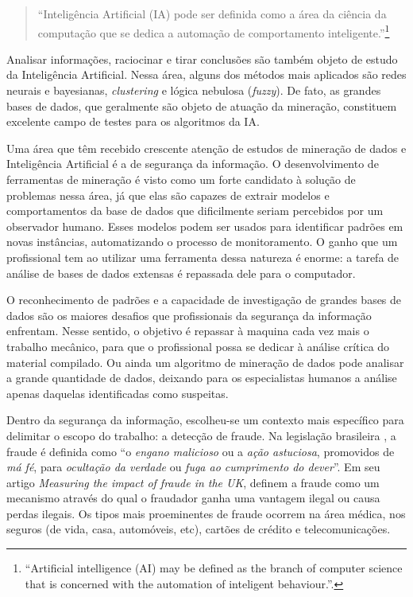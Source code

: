 \begin{quote}
``Inteligência Artificial (IA) pode ser definida como a área da ciência da computação que se dedica a automação de comportamento inteligente.''\footnote{``Artificial intelligence (AI) may be defined as the branch of computer science that is concerned with the automation of inteligent behaviour.''.}
\end{quote}

Analisar informações, raciocinar e tirar conclusões são também objeto de estudo da Inteligência Artificial. Nessa área, alguns dos métodos mais aplicados são redes neurais e bayesianas, \emph{clustering} e lógica nebulosa (\emph{fuzzy}). De fato, as grandes bases de dados, que geralmente são objeto de atuação da mineração, constituem excelente campo de testes para os algoritmos da IA. 

Uma área que têm recebido crescente atenção de estudos de mineração de dados e Inteligência Artificial é a de segurança da informação. O desenvolvimento de ferramentas de mineração é visto como um forte candidato à solução de problemas nessa área, já que elas são capazes de extrair modelos e comportamentos da base de dados que dificilmente seriam percebidos por um observador humano. Esses modelos podem ser usados para identificar padrões em novas instâncias, automatizando o processo de monitoramento. O ganho que um profissional tem ao utilizar uma ferramenta dessa natureza é enorme: a tarefa de análise de bases de dados extensas é repassada dele para o computador.

O reconhecimento de padrões e a capacidade de investigação de grandes bases de dados são os maiores desafios que profissionais da segurança da informação enfrentam. Nesse sentido, o objetivo é repassar à maquina cada vez mais o trabalho mecânico, para que o profissional possa se dedicar à análise crítica do material compilado. Ou ainda um algoritmo de mineração de dados pode analisar a grande quantidade de dados, deixando para os especialistas humanos a análise apenas daquelas identificadas como suspeitas.

Dentro da segurança da informação, escolheu-se um contexto mais específico para delimitar o escopo do trabalho: a detecção de fraude. Na legislação brasileira \cite[p. 324]{DePlacido1982}, a fraude é definida como ``o \emph{engano malicioso} ou a \emph{ação astuciosa}, promovidos de \emph{má fé}, para \emph{ocultação da verdade} ou \emph{fuga ao cumprimento do dever}''. Em seu artigo \emph{Measuring the impact of fraude in the UK}, \citet{Levi2008} definem a fraude como um mecanismo através do qual o fraudador ganha uma vantagem ilegal ou causa perdas ilegais. Os tipos mais proeminentes de fraude ocorrem na área médica, nos seguros (de vida, casa, automóveis, etc), cartões de crédito e telecomunicações.

